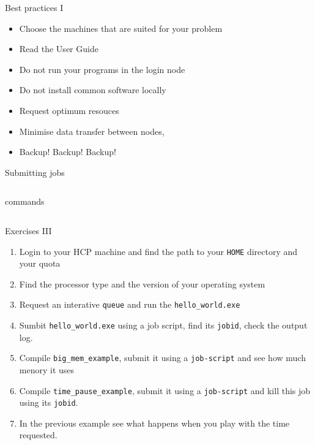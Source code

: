 \documentclass{beamer}
\begin{document}
\begin{frame}{Best practices I}
  \begin{itemize}
    \item Choose the machines that are suited for your problem
    \item Read the User Guide
    \item Do not run your programs in the login node
    \item Do not install common software locally
    \item Request optimum resouces
    \item Minimise data transfer between nodes,
    \item \alert{Backup! Backup! Backup!}
  \end{itemize}
\end{frame}

\begin{frame}[fragile]{Submitting jobs}
  \fontsize{9pt}{9}\selectfont
  \begin{columns}
    \begin{block}{commands}
      
    \end{block}

    \begin{example}
      
    \end{example}
  \end{columns}
\end{frame}

\begin{frame}{Exercises III}
  \fontsize{10pt}{8}\selectfont
  \begin{enumerate}
    \item Login to your HCP machine and find the path to your \texttt{HOME}
    directory and your quota
    \item Find the processor type and the version of your operating system
    \item Request an interative \texttt{queue} and run the \texttt{hello\_world.exe}
    \item Sumbit \texttt{hello\_world.exe} using a job script, find its \texttt{jobid}, check the output log.
    \item Compile \texttt{big\_mem\_example}, submit it using a \texttt{job-script} and see how much menory it uses
    \item Compile \texttt{time\_pause\_example}, submit it using a \texttt{job-script} and kill this job using its \texttt{jobid}.
    \item In the previous example see what happens when you play with the time requested.
  \end{enumerate}
\end{frame}
\end{document}
